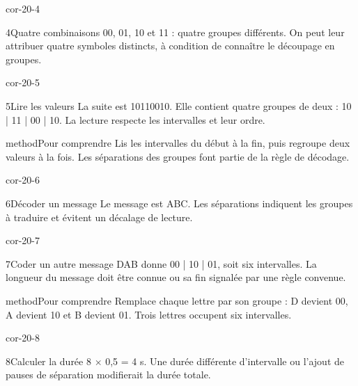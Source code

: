 \documentclass[12pt,twoside,openany]{book}
\begin{document}
\begin{blocLivre}{cor-20-4}
\begin{corrige}{4}{Quatre combinaisons}
00, 01, 10 et 11 : quatre groupes différents. On peut leur attribuer quatre symboles distincts, à condition de connaître le découpage en groupes.\par
\end{corrige}\end{blocLivre}
\begin{blocLivre}{cor-20-5}
\begin{corrige}{5}{Lire les valeurs}
La suite est 10110010. Elle contient quatre groupes de deux : 10 | 11 | 00 | 10. La lecture respecte les intervalles et leur ordre.\par
\begin{pcEncadre}{method}{Pour comprendre}
Lis les intervalles du début à la fin, puis regroupe deux valeurs à la fois. Les séparations des groupes font partie de la règle de décodage.\par
\end{pcEncadre}
\end{corrige}\end{blocLivre}
\begin{blocLivre}{cor-20-6}
\begin{corrige}{6}{Décoder un message}
Le message est ABC. Les séparations indiquent les groupes à traduire et évitent un décalage de lecture.\par
\end{corrige}\end{blocLivre}
\begin{blocLivre}{cor-20-7}
\begin{corrige}{7}{Coder un autre message}
DAB donne 00 | 10 | 01, soit six intervalles. La longueur du message doit être connue ou sa fin signalée par une règle convenue.\par
\begin{pcEncadre}{method}{Pour comprendre}
Remplace chaque lettre par son groupe : D devient 00, A devient 10 et B devient 01. Trois lettres occupent six intervalles.\par
\end{pcEncadre}
\end{corrige}\end{blocLivre}
\begin{blocLivre}{cor-20-8}
\begin{corrige}{8}{Calculer la durée}
8 \(\times\) 0,5 = 4 s. Une durée différente d’intervalle ou l’ajout de pauses de séparation modifierait la durée totale.\par
\end{corrige}\end{blocLivre}
\end{document}
